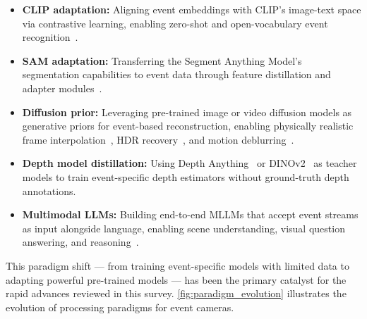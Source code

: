 \begin{itemize}[leftmargin=*]
    \item \textbf{CLIP adaptation:} Aligning event embeddings with CLIP's image-text space via contrastive learning, enabling zero-shot and open-vocabulary event recognition~\cite{wu2023eventclip,zhou2024eventbind,cho2025ezsr,kong2024openess}.

    \item \textbf{SAM adaptation:} Transferring the Segment Anything Model's segmentation capabilities to event data through feature distillation and adapter modules~\cite{chen2024eventsam,zhou2024sameventadapter}.

    \item \textbf{Diffusion prior:} Leveraging pre-trained image or video diffusion models as generative priors for event-based reconstruction, enabling physically realistic frame interpolation~\cite{chen2025revdm}, HDR recovery~\cite{yang2025hdrevdiff}, and motion deblurring~\cite{lee2025dietgs}.

    \item \textbf{Depth model distillation:} Using Depth Anything~\cite{xu2025depthanycvent} or DINOv2~\cite{liu2024spikedinov2} as teacher models to train event-specific depth estimators without ground-truth depth annotations.

    \item \textbf{Multimodal LLMs:} Building end-to-end MLLMs that accept event streams as input alongside language, enabling scene understanding, visual question answering, and reasoning~\cite{zhou2025eventgpt,li2025eventvl,kong2026eventflash}.
\end{itemize}

This paradigm shift --- from training event-specific models with limited data to adapting powerful pre-trained models --- has been the primary catalyst for the rapid advances reviewed in this survey. \cref{fig:paradigm_evolution} illustrates the evolution of processing paradigms for event cameras.

